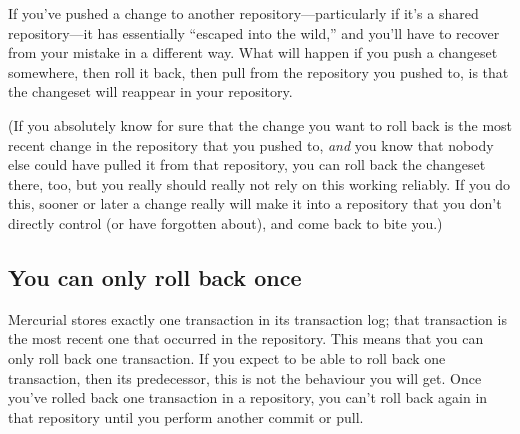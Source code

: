 If you've pushed a change to another repository---particularly if it's
a shared repository---it has essentially ``escaped into the wild,''
and you'll have to recover from your mistake in a different way.  What
will happen if you push a changeset somewhere, then roll it back, then
pull from the repository you pushed to, is that the changeset will
reappear in your repository.

(If you absolutely know for sure that the change you want to roll back
is the most recent change in the repository that you pushed to,
\emph{and} you know that nobody else could have pulled it from that
repository, you can roll back the changeset there, too, but you really
should really not rely on this working reliably.  If you do this,
sooner or later a change really will make it into a repository that
you don't directly control (or have forgotten about), and come back to
bite you.)

\subsection{You can only roll back once}

Mercurial stores exactly one transaction in its transaction log; that
transaction is the most recent one that occurred in the repository.
This means that you can only roll back one transaction.  If you expect
to be able to roll back one transaction, then its predecessor, this is
not the behaviour you will get.
Once you've rolled back one transaction in a repository, you can't
roll back again in that repository until you perform another commit or
pull.

